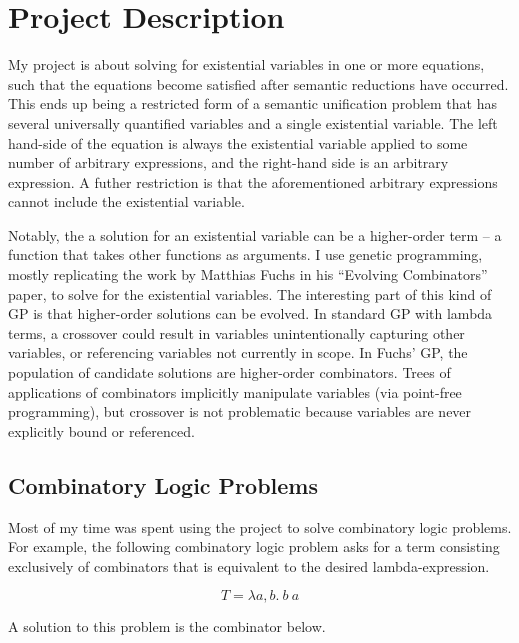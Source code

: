 \documentclass{article}
\begin{document}
\lstset{language=Haskell}

\maketitle

\section{Project Description}

My project is about solving for existential variables in one or more
equations, such that the equations become satisfied after semantic
reductions have occurred. This ends up being a restricted form of a
semantic unification problem that has several universally quantified
variables and a single existential variable. The left hand-side of the
equation is always the existential variable applied to some number of
arbitrary expressions, and the right-hand side is an arbitrary
expression. A futher restriction is that the aforementioned arbitrary
expressions cannot include the existential variable.

Notably, the a solution for an existential variable can be a
higher-order term -- a function that takes other functions as
arguments. I use genetic programming, mostly replicating the work by
Matthias Fuchs in his ``Evolving Combinators'' paper, to solve for the
existential variables. The interesting part of this kind of GP is that
higher-order solutions can be evolved. In standard GP with lambda
terms, a crossover could result in variables unintentionally capturing
other variables, or referencing variables not currently in scope. In
Fuchs' GP, the population of candidate solutions are higher-order
combinators. Trees of applications of combinators implicitly
manipulate variables (via point-free programming), but crossover is
not problematic because variables are never explicitly bound or
referenced.

\subsection{Combinatory Logic Problems}

Most of my time was spent using the project to solve combinatory logic
problems. For example, the following combinatory logic problem asks for a term
consisting exclusively of combinators that is equivalent to the
desired lambda-expression.

$$
T = \lambda a,b . ~ b ~ a
$$

A solution to this problem is the combinator below.
\end{document}
